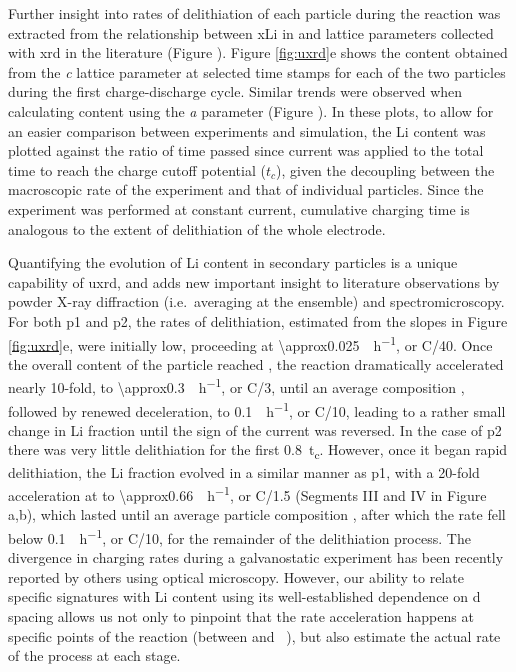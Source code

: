 \documentclass{article}
\begin{document}
\newpage %
Further insight into rates of delithiation of each particle during the
reaction was extracted from the relationship between \gls{xLi} in
 and lattice parameters collected with \gls{xrd} in the
literature\cite{robert2015} (Figure ).  Figure
\ref{fig:uxrd}e shows the  content obtained from the \emph{c}
lattice parameter at selected time stamps for each of the two 
particles during the first charge-discharge cycle. Similar trends were
observed when calculating  content using the \emph{a} parameter
(Figure ). In these plots, to allow for an easier
comparison between experiments and simulation, the Li content was
plotted against the ratio of time passed since current was applied to
the total time to reach the charge cutoff potential ($t_c$), given the
decoupling between the macroscopic rate of the experiment and that of
individual particles. Since the experiment was performed at constant
current, cumulative charging time is analogous to the extent of
delithiation of the whole electrode.

Quantifying the evolution of Li content in secondary particles is a
unique capability of \gls{uxrd}, and adds new important insight to
literature observations by powder X-ray diffraction (i.e.\ averaging
at the ensemble) and
spectromicroscopy\cite{doeff2017,wolf2017,hulzen2018,ahn2017,zhou2016-2,robert2015,yoon2006,hua2018,grenier2017,chapman2020,chueh2021,
  zhao2022, rao2021, wang2020-6}. For both \gls{p1} and \gls{p2}, the
rates of delithiation, estimated from the slopes in Figure
\ref{fig:uxrd}e, were initially low, proceeding at
\SI{\approx0.025}{\per\hour}, or C/40. Once the overall content
of the particle reached , the reaction dramatically
accelerated nearly 10-fold, to \SI{\approx0.3}{\per\hour}, or
C/3, until an average composition , followed by renewed
deceleration, to \SI{0.1}{\per\hour}, or C/10, leading to a
rather small change in Li fraction until the sign of the current was
reversed. In the case of \gls{p2} there was very little delithiation
for the first \SI{0.8}{t_c}. However, once it began rapid
delithiation, the Li fraction evolved in a similar manner as \gls{p1},
with a 20-fold acceleration at  to
\SI{\approx0.66}{\per\hour}, or C/1.5 (Segments III and IV in
Figure a,b), which lasted until an average particle
composition , after which the rate fell below
\SI{0.1}{\per\hour}, or C/10, for the remainder of the
delithiation process. The divergence in charging rates during a
galvanostatic experiment has been recently reported by others using
optical microscopy\cite{zhao2022}. However, our ability to relate
specific signatures with Li content using its well-established
dependence on d spacing allows us not only to pinpoint that the rate
acceleration happens at specific points of the reaction (between
 and ~), but also estimate the actual rate of the
process at each stage.
\end{document}
